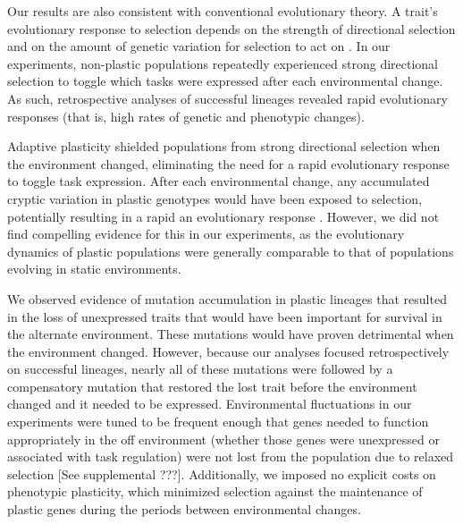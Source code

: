 
Our results are also consistent with conventional evolutionary theory.
A trait's evolutionary response to selection depends on the strength of directional selection and on the amount of genetic variation for selection to act on \citep{lande_measurement_1983,zimmer_evolution_2013}.
In our experiments, non-plastic populations repeatedly experienced strong directional selection to toggle which tasks were expressed after each environmental change.
As such, retrospective analyses of successful lineages revealed rapid evolutionary responses (that is, high rates of genetic and phenotypic changes).

Adaptive plasticity shielded populations from strong directional selection when the environment changed, eliminating the need for a rapid evolutionary response to toggle task expression. 
After each environmental change, any accumulated cryptic variation in plastic genotypes would have been exposed to selection, potentially resulting in a rapid an evolutionary response \citep{wund_assessing_2012}.
However, we did not find compelling evidence for this in our experiments, as the evolutionary dynamics of plastic populations were generally comparable to that of populations evolving in static environments.

We observed evidence of mutation accumulation in plastic lineages that resulted in the loss of unexpressed traits that would have been important for survival in the alternate environment.
These mutations would have proven detrimental when the environment changed.
However, because our analyses focused retrospectively on successful lineages, nearly all of these mutations were followed by a compensatory mutation that restored the lost trait before the environment changed and it needed to be expressed.
Environmental fluctuations in our experiments were tuned to be frequent enough that genes needed to function appropriately in the off environment (whether those genes were unexpressed or associated with task regulation) were not lost from the population due to relaxed selection [See supplemental ???].
Additionally, we imposed no explicit costs on phenotypic plasticity, which minimized selection against the maintenance of plastic genes during the periods between environmental changes.  

